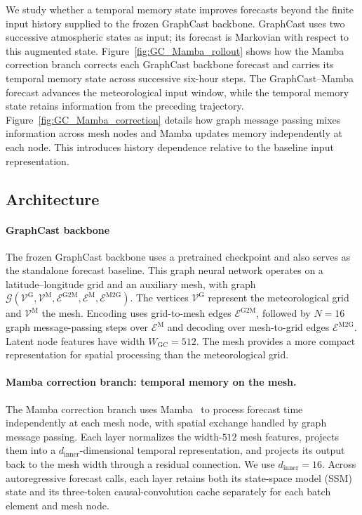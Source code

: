 \documentclass{article}
\begin{document}
We study whether {a temporal memory state improves forecasts beyond the finite input history supplied to the frozen GraphCast backbone}. GraphCast uses two successive atmospheric states as input; its forecast is Markovian with respect to this augmented state. Figure~\ref{fig:GC_Mamba_rollout} shows {how the Mamba correction branch corrects each GraphCast backbone forecast and carries its temporal memory state across successive six-hour steps. The GraphCast--Mamba forecast advances the meteorological input window, while the temporal memory state retains information from the preceding trajectory.} Figure~\ref{fig:GC_Mamba_correction} details how graph message passing mixes information across mesh nodes and Mamba updates memory independently at each node. This introduces history dependence relative to the baseline input representation.

\subsection{{Architecture}}

\paragraph{{GraphCast backbone}}
{The frozen GraphCast backbone uses a pretrained checkpoint and also serves as the standalone forecast baseline.} This graph neural network operates on a latitude--longitude grid and an auxiliary mesh, with graph $\mathcal{G}(\mathcal{V}^{\textrm{G}},\mathcal{V}^{\textrm{M}},\mathcal{E}^{\textrm{G2M}},\mathcal{E}^{\textrm{M}},\mathcal{E}^{\textrm{M2G}})$. The vertices $\mathcal{V}^{\textrm{G}}$ represent the meteorological grid and $\mathcal{V}^{\textrm{M}}$ the mesh. Encoding uses grid-to-mesh edges $\mathcal{E}^{\textrm{G2M}}$, followed by $N=16$ graph message-passing steps over $\mathcal{E}^{\textrm{M}}$ and decoding over mesh-to-grid edges $\mathcal{E}^{\textrm{M2G}}$. Latent node features have width $W_{\textrm{GC}}=512$. The mesh provides a more compact representation for spatial processing than the meteorological grid.

\paragraph{{Mamba correction branch: temporal memory on the mesh.}}
The Mamba correction branch uses Mamba~\citep{gu2023mamba} to process forecast time independently at each mesh node, with spatial exchange handled by graph message passing. Each layer normalizes the width-$512$ mesh features, projects them into a $d_{\mathrm{inner}}$-dimensional temporal representation, and projects its output back to the mesh width through a residual connection. We use $d_{\mathrm{inner}}=16$. Across autoregressive forecast calls, each layer retains both its {state-space model (SSM) state} and its three-token causal-convolution cache separately for each batch element and mesh node.
\end{document}
